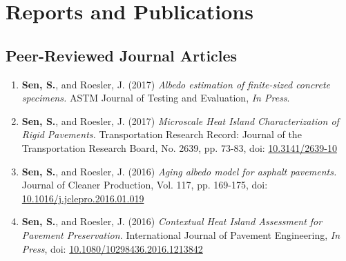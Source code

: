 \documentclass[12pt]{article}
\begin{document}
\section*{Reports and Publications}
\subsection*{Peer-Reviewed Journal Articles}
\begin{enumerate}[label=(J\arabic*)]
	\item \textbf{Sen, S.}, and Roesler, J. (2017) \textit{Albedo estimation of finite-sized concrete specimens.} ASTM Journal of Testing and Evaluation, \textit{In Press}.
	\item \textbf{Sen, S.}, and Roesler, J. (2017) \textit{Microscale Heat Island Characterization of Rigid Pavements.} Transportation Research Record: Journal of the Transportation Research Board, No. 2639, pp. 73-83, doi: \href{http://dx.doi.org/10.3141/2639-10}{10.3141/2639-10}
	\item \textbf{Sen, S.}, and Roesler, J. (2016) \textit{Aging albedo model for asphalt pavements.} Journal of Cleaner Production, Vol. 117, pp. 169-175, doi: \href{http://dx.doi.org/10.1016/j.jclepro.2016.01.019}{10.1016/j.jclepro.2016.01.019}
	\item \textbf{Sen, S.}, and Roesler, J. (2016) \textit{Contextual Heat Island Assessment for Pavement Preservation.} International Journal of Pavement Engineering, \textit{In Press}, doi: \href{http://dx.doi.org/10.1016/10.1080/10298436.2016.1213842}{10.1080/10298436.2016.1213842}
\end{enumerate}
\end{document}
